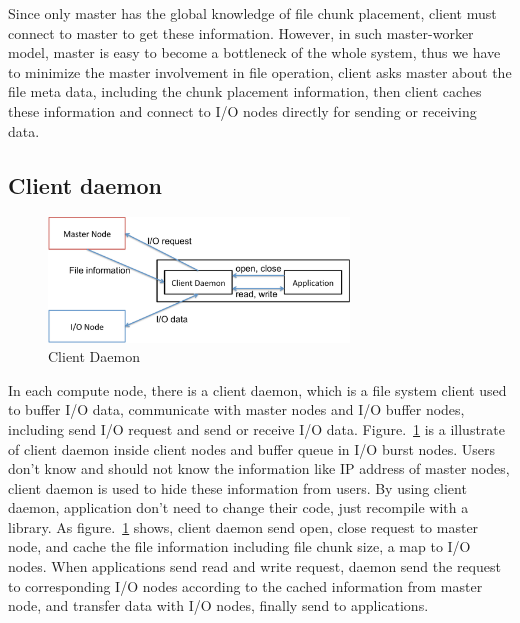 Since only master has the global knowledge of file chunk placement, client must connect to master
to get these information.
However, in such master-worker model, master is easy to become a bottleneck of the whole system,
thus we have to minimize the master involvement in file operation, client asks master about the
file meta data, including the chunk placement information, then client caches these information and
connect to I/O nodes directly for sending or receiving data.

\subsection{Client daemon}

\begin{figure}[tb]
	\centering
	\includegraphics[width=8cm]{img/client_daemon}
	\caption{Client Daemon}
	\label{implementaion:client_daemon}
\end{figure}

In each compute node, there is a client daemon, which is a file system client used to buffer I/O
data, communicate with master nodes and I/O buffer nodes, including send I/O request and send or
receive I/O data.
Figure.~\ref{implementaion:client_daemon} is a illustrate of client daemon inside client nodes and
buffer queue in I/O burst nodes.
Users don't know and should not know the information like IP address of master nodes,  client daemon
is used to hide these information from users.
By using client daemon, application don't need to change their code, just recompile with a library.
As figure.~\ref{implementaion:client_daemon} shows, client daemon send open, close request to master node, and cache the file information including file chunk size, a map to I/O nodes.
When applications send read and write request, daemon send the request to corresponding I/O nodes
according to the cached information from master node, and transfer data with I/O nodes, finally
send to applications.


